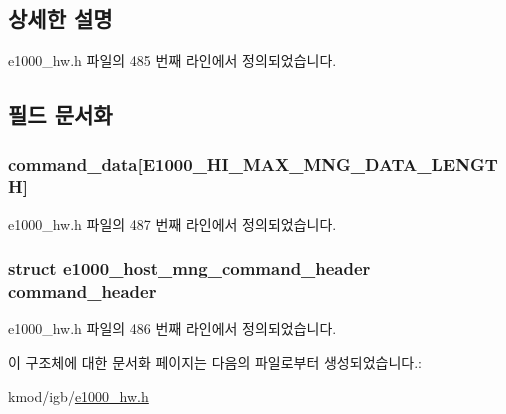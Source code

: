 \subsection{상세한 설명}


e1000\+\_\+hw.\+h 파일의 485 번째 라인에서 정의되었습니다.



\subsection{필드 문서화}
\subsubsection[{\texorpdfstring{command\+\_\+data}{command_data}}]{ command\+\_\+data\mbox{[}{\bf E1000\+\_\+\+H\+I\+\_\+\+M\+A\+X\+\_\+\+M\+N\+G\+\_\+\+D\+A\+T\+A\+\_\+\+L\+E\+N\+G\+TH}\mbox{]}}\hypertarget{structe1000__host__mng__command__info_a4e3d176e805d3f02cb8e8a8b4021f094}{}\label{structe1000__host__mng__command__info_a4e3d176e805d3f02cb8e8a8b4021f094}


e1000\+\_\+hw.\+h 파일의 487 번째 라인에서 정의되었습니다.

\subsubsection[{\texorpdfstring{command\+\_\+header}{command_header}}]{\setlength{\rightskip}{0pt plus 5cm}struct {\bf e1000\+\_\+host\+\_\+mng\+\_\+command\+\_\+header} command\+\_\+header}\hypertarget{structe1000__host__mng__command__info_a29cc0985a69d0e46462897093986d94c}{}\label{structe1000__host__mng__command__info_a29cc0985a69d0e46462897093986d94c}


e1000\+\_\+hw.\+h 파일의 486 번째 라인에서 정의되었습니다.



이 구조체에 대한 문서화 페이지는 다음의 파일로부터 생성되었습니다.\+:\begin{DoxyCompactItemize}
\item 
kmod/igb/\hyperlink{kmod_2igb_2e1000__hw_8h}{e1000\+\_\+hw.\+h}\end{DoxyCompactItemize}
